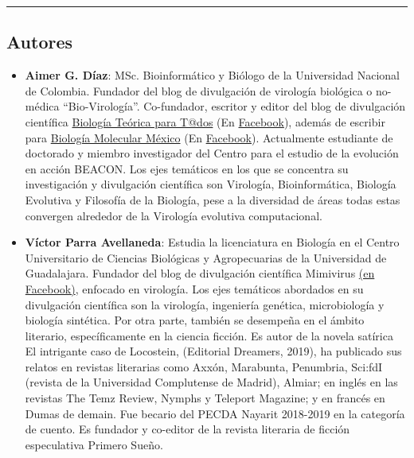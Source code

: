 \documentclass[
  12pt, krantz2,
  spanish,
]{krantz}
\begin{document}
\begin{center}\rule{0.5\linewidth}{0.5pt}\end{center}

\hypertarget{autores}{%
\subsection*{Autores}\label{autores}}

\begin{itemize}
\item
  \textbf{Aimer G. Díaz}: MSc. Bioinformático y Biólogo de la Universidad Nacional de Colombia. Fundador del blog de divulgación de virología biológica o no-médica ``Bio-Virología''. Co-fundador, escritor y editor del blog de divulgación científica \href{https://bioteorica.wixsite.com/bioteorica/blog}{Biología Teórica para T@dos} (En \href{https://www.facebook.com/BioTeoricaParaTodos/}{Facebook}), además de escribir para \href{http://www.biologiamolecularmexico.com/}{Biología Molecular México} (En \href{https://www.facebook.com/biologiamolecularmexico/}{Facebook}). Actualmente estudiante de doctorado y miembro investigador del Centro para el estudio de la evolución en acción BEACON. Los ejes temáticos en los que se concentra su investigación y divulgación científica son Virología, Bioinformática, Biología Evolutiva y Filosofía de la Biología, pese a la diversidad de áreas todas estas convergen alrededor de la Virología evolutiva computacional.
\item
  \textbf{Víctor Parra Avellaneda}: Estudia la licenciatura en Biología en el Centro Universitario de Ciencias Biológicas y Agropecuarias de la Universidad de Guadalajara. Fundador del blog de divulgación científica Mimivirus \href{https://www.facebook.com/Mimivirus-100736401569015}{(en Facebook)}, enfocado en virología. Los ejes temáticos abordados en su divulgación científica son la virología, ingeniería genética, microbiología y biología sintética. Por otra parte, también se desempeña en el ámbito literario, específicamente en la ciencia ficción. Es autor de la novela satírica El intrigante caso de Locostein, (Editorial Dreamers, 2019), ha publicado sus relatos en revistas literarias como Axxón, Marabunta, Penumbria, Sci:fdI (revista de la Universidad Complutense de Madrid), Almiar; en inglés en las revistas The Temz Review, Nymphs y Teleport Magazine; y en francés en Dumas de demain. Fue becario del PECDA Nayarit 2018-2019 en la categoría de cuento. Es fundador y co-editor de la revista literaria de ficción especulativa Primero Sueño.

\end{itemize}
\end{document}
